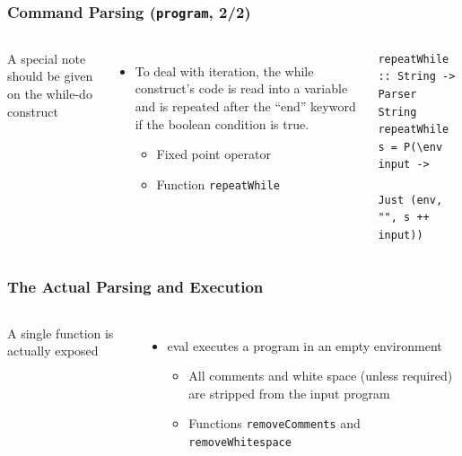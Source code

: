 \documentclass{beamer}
\begin{document}
\begin{frame}[fragile]
	\frametitle{Command Parsing (\texttt{program}, 2/2)}
	\begin{columns}
		\small
		A special note should be given on the while-do construct
		\begin{itemize}
			\small
			\item To deal with iteration, the while construct’s code is read
				into a variable and is repeated after the “end” keyword if the
				boolean condition is true.
			\begin{itemize}
				\footnotesize
				\item Fixed point operator
				\item Function \texttt{repeatWhile}
			\end{itemize}
		\end{itemize}
		
\begin{lstlisting}[basicstyle=\ttfamily\tiny]
repeatWhile :: String -> Parser String
repeatWhile s = P(\env input ->
                  Just (env, "", s ++ input))
\end{lstlisting}
	\end{columns}
\end{frame}


\begin{frame}[fragile]
	\frametitle{The Actual Parsing and Execution}
	\begin{columns}
		\column{0.35\textwidth}
		\small
		A single function is actually exposed
		\begin{itemize}
			\small
		\item eval executes a program in an empty environment
			\begin{itemize}
				\footnotesize
				\item All comments and white space (unless required) are
					stripped from the input program
				\item Functions \texttt{removeComments} and
					\texttt{removeWhitespace}
			\end{itemize}
		\end{itemize}
		\column{0.6\textwidth}
		
	\end{columns}
\end{frame}
\end{document}
